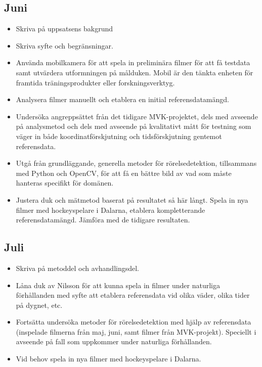 \documentclass[a4paper,12pt]{article}
\begin{document}
\subsection*{Juni}
\begin{itemize}
  \item Skriva på uppsatsens bakgrund
  \item Skriva syfte och begränsningar.
  \item Använda mobilkamera för att spela in preliminära filmer för
    att få testdata samt utvärdera utformningen på målduken.
    Mobil är den tänkta enheten för framtida träningsprodukter eller
    forskningsverktyg.
  \item Analysera filmer manuellt och etablera en initial referensdatamängd.
  \item Undersöka angreppsättet från det tidigare MVK-projektet, dels med
    avseende på analysmetod och dels med avseende på kvalitativt mått för
    testning som väger in både koordinatförskjutning och tidsförskjutning
    gentemot referensdata.
  \item Utgå från grundläggande, generella metoder för rörelsedetektion,
    tillsammans med Python och OpenCV, för att få en bättre bild av vad som
    måste hanteras specifikt för domänen.
  \item Justera duk och mätmetod baserat på resultatet så här långt. Spela
    in nya filmer med hockeyspelare i Dalarna, etablera kompletterande
    referensdatamängd. Jämföra med de tidigare resultaten.
\end{itemize}

\subsection*{Juli}
\begin{itemize}
  \item Skriva på metoddel och avhandlingsdel.
  \item Låna duk av Nilsson för att kunna spela in filmer under naturliga
    förhållanden med syfte att etablera referensdata vid olika väder, olika
    tider på dygnet, etc.
  \item Fortsätta undersöka metoder för rörelsedetektion med hjälp av
    referensdata (inspelade filmerna från maj, juni, samt filmer från
    MVK-projekt). Speciellt i avseende på fall som uppkommer under
    naturliga förhållanden.
  \item Vid behov spela in nya filmer med hockeyspelare i Dalarna.
\end{itemize}
\end{document}

